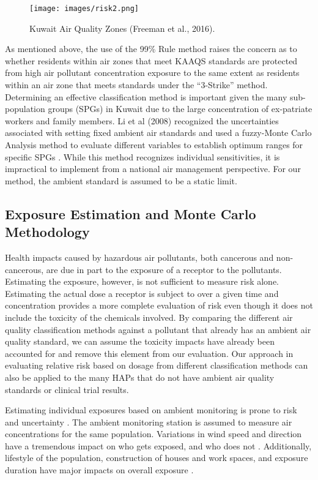 %  
\begin{figure}
\texttt{[image: images/risk2.png]} 
\caption[Kuwait Air Quality Zones]{Kuwait Air Quality Zones (Freeman et al., 2016).}
\label{fig2:aqzkuwait}
\end{figure}

As mentioned above, the use of the 99\% Rule method raises the concern as to whether residents within air zones that meet KAAQS standards are protected from high air pollutant concentration exposure to the same extent as residents within an air zone that meets standards under the ``3-Strike” method. Determining an effective classification method is important given the many sub-population groups (SPGs) in Kuwait due to the large concentration of ex-patriate workers and family members. Li et al (2008) recognized the uncertainties associated with setting fixed ambient air standards and used a fuzzy-Monte Carlo Analysis method to evaluate different variables to establish optimum ranges for specific SPGs \citep{Li2008}. While this method recognizes individual sensitivities, it is impractical to implement from a national air management perspective. For our method, the ambient standard is assumed to be a static limit.

\subsection{Exposure Estimation and Monte Carlo Methodology}

Health impacts caused by hazardous air pollutants, both cancerous and non-cancerous, are due in part to the exposure of a receptor to the pollutants. Estimating the exposure, however, is not sufficient to measure risk alone. Estimating the actual dose a receptor is subject to over a given time and concentration provides a more complete evaluation of risk even though it does not include the toxicity of the chemicals involved. By comparing the different air quality classification methods against a pollutant that already has an ambient air quality standard, we can assume the toxicity impacts have already been accounted for and remove this element from our evaluation. Our approach in evaluating relative risk based on dosage from different classification methods can also be applied to the many HAPs that do not have ambient air quality standards or clinical trial results.

Estimating individual exposures based on ambient monitoring is prone to risk and uncertainty \citep{Pernigotti2013, Thunis2013}.  The ambient monitoring station is assumed to measure air concentrations for the same population.  Variations in wind speed and direction have a tremendous impact on who gets exposed, and who does not \citep{Pratt2012}. Additionally, lifestyle of the population, construction of houses and work spaces, and exposure duration have major impacts on overall exposure \citep{Bell2006}.

